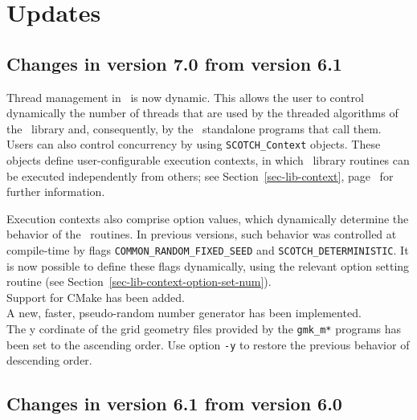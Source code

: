 
\section{Updates}
\label{sec-changes}

\subsection{Changes in version 7.0 from version 6.1}

Thread management in \scotch\ is now dynamic. This allows the user to
control dynamically the number of threads that are used by the
threaded algorithms of the \libscotch\ library and, consequently, by
the \scotch\ standalone programs that call them. Users can also
control concurrency by using \texttt{SCOTCH\_\lbt Context}
objects. These objects define user-configurable execution contexts, in
which \libscotch\ library routines can be executed independently from
others; see Section~\ref{sec-lib-context},
page~\pageref{sec-lib-context} for further information.

Execution contexts also comprise option values, which dynamically
determine the behavior of the \scotch\ routines. In previous versions,
such behavior was controlled at compile-time by flags
\texttt{COMMON\_\lbt RANDOM\_\lbt FIXED\_\lbt SEED} and
\texttt{SCOTCH\_\lbt DETERMINISTIC}. It is now possible to define
these flags dynamically, using the relevant option setting routine
(see Section~\ref{sec-lib-context-option-set-num}).
\\

Support for CMake has been added.
\\

A new, faster, pseudo-random number generator has been implemented.
\\

The y cordinate of the grid geometry files provided by the
\texttt{gmk\_m*} programs has been set to the ascending order. Use
option \texttt{-y} to restore the previous behavior of descending
order.

\subsection{Changes in version 6.1 from version 6.0}

